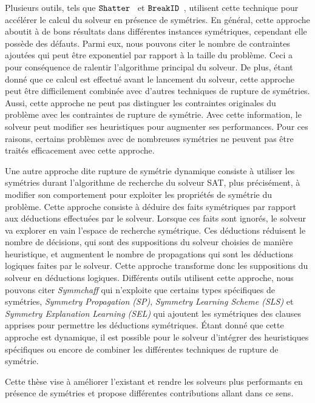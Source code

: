 Plusieurs outils, tels que $\texttt{Shatter}$~\cite{aloul06} et $\texttt{BreakID}$~\cite{devriendt2016improved}, utilisent cette technique pour accélérer le calcul du solveur en présence de symétries.
En général, cette approche aboutit à de bons résultats dans différentes instances symétriques, cependant elle possède des défauts. Parmi eux, nous pouvons citer le nombre de contraintes ajoutées qui peut être exponentiel par rapport à la taille du problème. Ceci 
a pour conséquence de ralentir l'algorithme principal du solveur.
De plus, étant donné que ce calcul est effectué avant le lancement du solveur, cette approche peut être difficilement combinée avec d'autres techniques de rupture de symétries. Aussi, cette approche ne peut pas distinguer les contraintes originales du problème avec les contraintes de rupture de symétrie. Avec cette information, le solveur peut modifier ses heuristiques pour augmenter ses performances.
Pour ces raisons, certains problèmes avec de nombreuses symétries ne peuvent pas être traités efficacement avec cette approche.

Une autre approche dite rupture de symétrie dynamique consiste à utiliser les symétries durant l'algorithme de recherche du solveur SAT, plus précisément, à modifier son comportement pour exploiter les propriétés de symétrie du problème. Cette approche consiste à déduire des faits symétriques par rapport aux déductions effectuées par le solveur. Lorsque ces faits sont ignorés, le solveur va explorer en vain l'espace de recherche symétrique.
Ces déductions réduisent le nombre de décisions, qui sont des suppositions du solveur choisies de 
manière heuristique, et augmentent le nombre de propagations qui sont les déductions logiques faites par le solveur. 
Cette approche transforme donc les suppositions du solveur en déductions logiques.
Différents outils utilisent cette approche, nous pouvons citer \textit{Symmchaff}
qui n'exploite que certains types spécifiques de symétries, \textit{Symmetry Propagation (SP)}, \textit{Symmetry Learning Scheme (SLS)} et \textit{Symmetry Explanation Learning (SEL)} qui ajoutent les symétriques des
clauses apprises pour permettre les déductions symétriques.
Étant donné que cette approche est dynamique, il est possible pour le solveur 
d'intégrer des heuristiques spécifiques ou encore de combiner les différentes techniques de rupture de symétrie.


Cette thèse vise à améliorer l'existant et rendre les solveurs plus performants en présence de symétries et
propose différentes contributions allant dans ce sens.  


